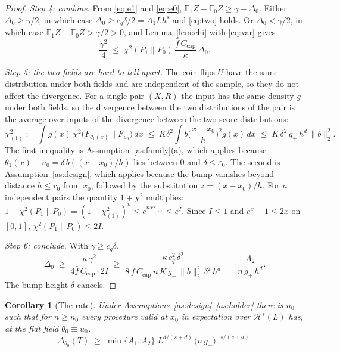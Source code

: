\documentclass[11pt]{article}
\newtheorem{corollary}[theorem]{Corollary}
\theoremstyle{definition}
\theoremstyle{remark}
\newcommand{\E}{\mathbb{E}}
\newcommand{\chis}{\chi^2}
\begin{document}
\begin{proof}
\emph{Step 4: combine.} From \eqref{eq:e1} and \eqref{eq:e0},
$\E_1Z-\E_0Z\ge\gamma-\Delta_0$. Either $\Delta_0\ge\gamma/2$, in which case
$\Delta_0\ge c_q\delta/2=A_1Lh^s$ and \eqref{eq:two} holds. Or $\Delta_0<\gamma/2$, in
which case $\E_1Z-\E_0Z>\gamma/2>0$, and Lemma~\ref{lem:chi} with \eqref{eq:var} gives
\[
  \frac{\gamma^2}{4}\;\le\;\chis(P_1\|P_0)\,\frac{\bar f\,C_{\mathrm{cap}}}{\kappa}\,\Delta_0 .
\]

\emph{Step 5: the two fields are hard to tell apart.} The coin flips $U$ have the same
distribution under both fields and are independent of the sample, so they do not affect the
divergence. For a single pair $(X,R)$ the input has the same density $g$ under both fields,
so the divergence between the two distributions of the pair is the average over inputs of
the divergence between the two score distributions:
\[
  \chi^2_{(1)}:=\int g(x)\,\chis\big(F_{\theta_1(x)}\|F_{u_0}\big)\,dx
  \;\le\;K\delta^2\!\int b\Big(\frac{x-x_0}{h}\Big)^{\!2}g(x)\,dx
  \;\le\;K\,\delta^2\,g_+\,h^d\,\|b\|_2^2 .
\]
The first inequality is Assumption~\ref{as:family}(a), which applies because
$\theta_1(x)-u_0=\delta\,b((x-x_0)/h)$ lies between $0$ and $\delta\le\varepsilon_0$. The
second is Assumption~\ref{as:design}, which applies because the bump vanishes beyond
distance $h\le r_0$ from $x_0$, followed by the substitution $z=(x-x_0)/h$. For $n$
independent pairs the quantity $1+\chis$ multiplies:
$1+\chis(P_1\|P_0)=(1+\chi^2_{(1)})^n\le e^{n\chi^2_{(1)}}\le e^{I}$. Since $I\le1$ and
$e^x-1\le 2x$ on $[0,1]$, $\chis(P_1\|P_0)\le 2I$.

\emph{Step 6: conclude.} With $\gamma\ge c_q\delta$,
\[
  \Delta_0\;\ge\;\frac{\kappa\,\gamma^2}{4\bar f\,C_{\mathrm{cap}}\cdot 2I}
   \;\ge\;\frac{\kappa\,c_q^2\,\delta^2}
     {8\,\bar f\,C_{\mathrm{cap}}\,n\,K\,g_+\,\|b\|_2^2\,\delta^2\,h^d}
   \;=\;\frac{A_2}{n\,g_+\,h^d}.
\]
The bump height $\delta$ cancels.
\end{proof}

\begin{corollary}[The rate]\label{cor:rate}
Under Assumptions~\ref{as:design}--\ref{as:holder} there is $n_0$ such that for $n\ge n_0$
every procedure valid at $x_0$ in expectation over $\mathcal H^s(L)$ has, at the flat field
$\theta_0\equiv u_0$,
\[
  \Delta_{\theta_0}(T)\;\ge\;
  \min\{A_1,A_2\}\;L^{d/(s+d)}\,\big(n\,g_+\big)^{-s/(s+d)} .
\]
\end{corollary}
\end{document}
